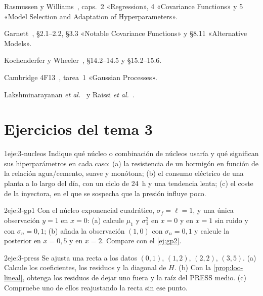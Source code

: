 \begin{lecturas}
\item Rasmussen y Williams~\cite{rw}, caps.~2 «Regression», 4 «Covariance Functions» y 5 «Model Selection and Adaptation of Hyperparameters».
\item Garnett~\cite{garnett}, §2.1–2.2, §3.3 «Notable Covariance Functions» y §8.11 «Alternative Models».
\item Kochenderfer y Wheeler~\cite{kw}, §14.2–14.5 y §15.2–15.6.
\item Cambridge 4F13~\cite{cam4f13}, tarea~1 «Gaussian Processes».
\item Lakshminarayanan \emph{et al.}~\cite{lakshmi} y Raissi \emph{et al.}~\cite{raissi}.
\end{lecturas}

\section*{Ejercicios del tema 3}

\begin{ejercicio}{1}{eje:3-nucleos}
Indique qué núcleo o combinación de núcleos usaría y qué significan sus hiperparámetros en cada caso: (a) la resistencia de un hormigón en función de la relación agua/cemento, suave y monótona; (b) el consumo eléctrico de una planta a lo largo del día, con un ciclo de 24~h y una tendencia lenta; (c) el coste de la inyectora, en el que se sospecha que la presión influye poco.
\end{ejercicio}

\begin{ejercicio}{2}{eje:3-gp1}
Con el núcleo exponencial cuadrático, $\sigma_f=\ell=1$, y una única observación $y=1$ en $x=0$: (a) calcule $\mu_1$ y $\sigma_1^2$ en $x=0$ y en $x=1$ sin ruido y con $\sigma_n=0{,}1$; (b) añada la observación $(1,0)$ con $\sigma_n=0{,}1$ y calcule la posterior en $x=0{,}5$ y en $x=2$. Compare con el \cref{ej:gp2}.
\end{ejercicio}

\begin{ejercicio}{2}{eje:3-press}
Se ajusta una recta a los datos $(0,1)$, $(1,2)$, $(2,2)$, $(3,5)$. (a) Calcule los coeficientes, los residuos y la diagonal de $H$. (b) Con la \cref{prop:loo-lineal}, obtenga los residuos de dejar uno fuera y la raíz del PRESS medio. (c) Compruebe uno de ellos reajustando la recta sin ese punto.
\end{ejercicio}

